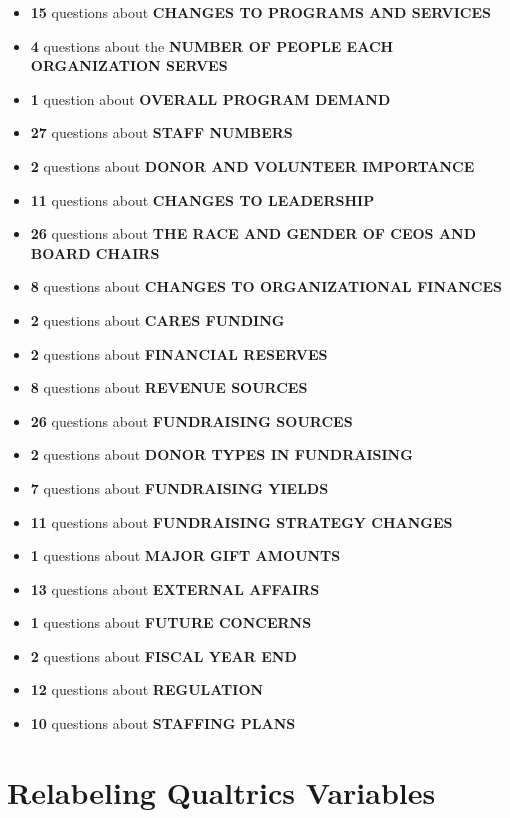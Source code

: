 \documentclass[
  letterpaper,
]{scrbook}
\providecommand{\tightlist}{%
  \setlength{\itemsep}{0pt}\setlength{\parskip}{0pt}}\usepackage{longtable,booktabs,array}
\begin{document}
\begin{itemize}
\tightlist
\item
  \textbf{15} questions about \textbf{CHANGES TO PROGRAMS AND SERVICES}
\item
  \textbf{4} questions about the \textbf{NUMBER OF PEOPLE EACH
  ORGANIZATION SERVES}
\item
  \textbf{1} question about \textbf{OVERALL PROGRAM DEMAND}
\item
  \textbf{27} questions about \textbf{STAFF NUMBERS}
\item
  \textbf{2} questions about \textbf{DONOR AND VOLUNTEER IMPORTANCE}
\item
  \textbf{11} questions about \textbf{CHANGES TO LEADERSHIP}
\item
  \textbf{26} questions about \textbf{THE RACE AND GENDER OF CEOS AND
  BOARD CHAIRS}
\item
  \textbf{8} questions about \textbf{CHANGES TO ORGANIZATIONAL FINANCES}
\item
  \textbf{2} questions about \textbf{CARES FUNDING}
\item
  \textbf{2} questions about \textbf{FINANCIAL RESERVES}
\item
  \textbf{8} questions about \textbf{REVENUE SOURCES}
\item
  \textbf{26} questions about \textbf{FUNDRAISING SOURCES}
\item
  \textbf{2} questions about \textbf{DONOR TYPES IN FUNDRAISING}
\item
  \textbf{7} questions about \textbf{FUNDRAISING YIELDS}
\item
  \textbf{11} questions about \textbf{FUNDRAISING STRATEGY CHANGES}
\item
  \textbf{1} questions about \textbf{MAJOR GIFT AMOUNTS}
\item
  \textbf{13} questions about \textbf{EXTERNAL AFFAIRS}\\
\item
  \textbf{1} questions about \textbf{FUTURE CONCERNS}
\item
  \textbf{2} questions about \textbf{FISCAL YEAR END}
\item
  \textbf{12} questions about \textbf{REGULATION}
\item
  \textbf{10} questions about \textbf{STAFFING PLANS}
\end{itemize}

\chapter{Relabeling Qualtrics
Variables}\label{relabeling-qualtrics-variables-1}
\end{document}
